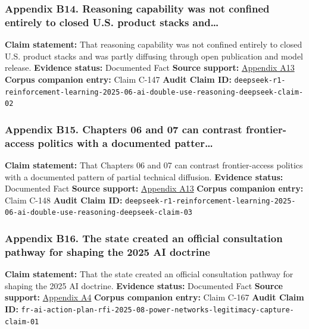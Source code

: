 \documentclass[
  american,
  11pt,
  letterpaper,
]{article}
\begin{document}
\subsubsection{Appendix B14. Reasoning capability was not confined
entirely to closed U.S. product stacks
and\ldots{}}\label{ch-07-appendix-b14-reasoning-capability-was-not-confined-entirely-to-closed-u-s-product-stacks-and}

\textbf{Claim statement:} That reasoning capability was not confined
entirely to closed U.S. product stacks and was partly diffusing through
open publication and model release. \textbf{Evidence status:} Documented
Fact \textbf{Source support:}
\hyperref[ch-07-appendix-a13-deepseek-r1-incentivizing-reasoning-capability-in-llms-via-reinforcement-learning]{Appendix
A13} \textbf{Corpus companion entry:} Claim C-147 \textbf{Audit Claim
ID:}
\texttt{deepseek-r1-reinforcement-learning-2025-06-ai-double-use-reasoning-deepseek-claim-02}

\subsubsection{Appendix B15. Chapters 06 and 07 can contrast
frontier-access politics with a documented
patter\ldots{}}\label{ch-07-appendix-b15-chapters-06-and-07-can-contrast-frontier-access-politics-with-a-documented-patter}

\textbf{Claim statement:} That Chapters 06 and 07 can contrast
frontier-access politics with a documented pattern of partial technical
diffusion. \textbf{Evidence status:} Documented Fact \textbf{Source
support:}
\hyperref[ch-07-appendix-a13-deepseek-r1-incentivizing-reasoning-capability-in-llms-via-reinforcement-learning]{Appendix
A13} \textbf{Corpus companion entry:} Claim C-148 \textbf{Audit Claim
ID:}
\texttt{deepseek-r1-reinforcement-learning-2025-06-ai-double-use-reasoning-deepseek-claim-03}

\subsubsection{Appendix B16. The state created an official consultation
pathway for shaping the 2025 AI
doctrine}\label{ch-07-appendix-b16-the-state-created-an-official-consultation-pathway-for-shaping-the-2025-ai-doctrine}

\textbf{Claim statement:} That the state created an official
consultation pathway for shaping the 2025 AI doctrine. \textbf{Evidence
status:} Documented Fact \textbf{Source support:}
\hyperref[ch-07-appendix-a4-request-for-information-on-the-development-of-an-artificial-intelligence-ai-action-plan]{Appendix
A4} \textbf{Corpus companion entry:} Claim C-167 \textbf{Audit Claim
ID:}
\texttt{fr-ai-action-plan-rfi-2025-08-power-networks-legitimacy-capture-claim-01}
\end{document}
